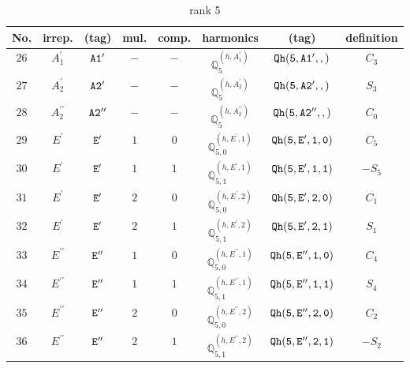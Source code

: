 \documentclass[fleqn,8pt]{jsarticle}
\begin{document}
\begin{table}[ht!]
\begin{center}
\caption{rank 5}
\renewcommand{\arraystretch}{1.3}
\begin{tabular}{cccccccc} \hline \hline
No. & irrep. & (tag) & mul. & comp. & harmonics & (tag) & definition \\ \hline
$ 26 $ & $ A_{1}^{\prime} $ & $ {\tt A1'} $ & $ - $ & $ - $ & $ \mathbb{Q}_{5}^{(h,A_{1}^{\prime})} $ & $ {\tt Qh(5,A1',,)} $ & $ C_{3} $ \\
$ 27 $ & $ A_{2}^{\prime} $ & $ {\tt A2'} $ & $ - $ & $ - $ & $ \mathbb{Q}_{5}^{(h,A_{2}^{\prime})} $ & $ {\tt Qh(5,A2',,)} $ & $ S_{3} $ \\
$ 28 $ & $ A_{2}^{\prime\prime} $ & $ {\tt A2''} $ & $ - $ & $ - $ & $ \mathbb{Q}_{5}^{(h,A_{2}^{\prime\prime})} $ & $ {\tt Qh(5,A2'',,)} $ & $ C_{0} $ \\
$ 29 $ & $ E^{\prime} $ & $ {\tt E'} $ & $ 1 $ & $ 0 $ & $ \mathbb{Q}_{5,0}^{(h,E^{\prime},1)} $ & $ {\tt Qh(5,E',1,0)} $ & $ C_{5} $ \\
$ 30 $ & $ E^{\prime} $ & $ {\tt E'} $ & $ 1 $ & $ 1 $ & $ \mathbb{Q}_{5,1}^{(h,E^{\prime},1)} $ & $ {\tt Qh(5,E',1,1)} $ & $ - S_{5} $ \\
$ 31 $ & $ E^{\prime} $ & $ {\tt E'} $ & $ 2 $ & $ 0 $ & $ \mathbb{Q}_{5,0}^{(h,E^{\prime},2)} $ & $ {\tt Qh(5,E',2,0)} $ & $ C_{1} $ \\
$ 32 $ & $ E^{\prime} $ & $ {\tt E'} $ & $ 2 $ & $ 1 $ & $ \mathbb{Q}_{5,1}^{(h,E^{\prime},2)} $ & $ {\tt Qh(5,E',2,1)} $ & $ S_{1} $ \\
$ 33 $ & $ E^{\prime\prime} $ & $ {\tt E''} $ & $ 1 $ & $ 0 $ & $ \mathbb{Q}_{5,0}^{(h,E^{\prime\prime},1)} $ & $ {\tt Qh(5,E'',1,0)} $ & $ C_{4} $ \\
$ 34 $ & $ E^{\prime\prime} $ & $ {\tt E''} $ & $ 1 $ & $ 1 $ & $ \mathbb{Q}_{5,1}^{(h,E^{\prime\prime},1)} $ & $ {\tt Qh(5,E'',1,1)} $ & $ S_{4} $ \\
$ 35 $ & $ E^{\prime\prime} $ & $ {\tt E''} $ & $ 2 $ & $ 0 $ & $ \mathbb{Q}_{5,0}^{(h,E^{\prime\prime},2)} $ & $ {\tt Qh(5,E'',2,0)} $ & $ C_{2} $ \\
$ 36 $ & $ E^{\prime\prime} $ & $ {\tt E''} $ & $ 2 $ & $ 1 $ & $ \mathbb{Q}_{5,1}^{(h,E^{\prime\prime},2)} $ & $ {\tt Qh(5,E'',2,1)} $ & $ - S_{2} $ \\
 \hline \hline
\end{tabular}
\end{center}
\end{table}
\end{document}
